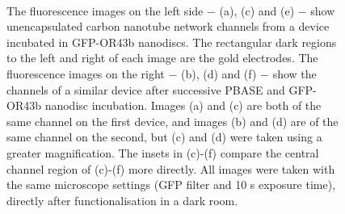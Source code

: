 \documentclass[
  a4paper,
]{scrbook}
\begin{document}
\begin{figure}
\begin{minipage}[t]{0.47\linewidth}
{{}

}

\subcaption{\label{fig-GFP-OR-ch3}}
\end{minipage}%
%
\begin{minipage}[t]{0.05\linewidth}

{\centering 

~

}

\end{minipage}%
%
\begin{minipage}[t]{0.47\linewidth}

{\centering 


}

\subcaption{\label{fig-PBASE-GFP-OR-ch2}}
\end{minipage}%

\caption{\label{fig-PBASE-GFP-ORs}The fluorescence images on the left
side \(-\) (a), (c) and (e) \(-\) show unencapsulated carbon nanotube
network channels from a device incubated in GFP-OR43b nanodiscs. The
rectangular dark regions to the left and right of each image are the
gold electrodes. The fluorescence images on the right \(-\) (b), (d) and
(f) \(-\) show the channels of a similar device after successive PBASE
and GFP-OR43b nanodisc incubation. Images (a) and (c) are both of the
same channel on the first device, and images (b) and (d) are of the same
channel on the second, but (c) and (d) were taken using a greater
magnification. The insets in (c)-(f) compare the central channel region
of (c)-(f) more directly. All images were taken with the same microscope
settings (GFP filter and 10 s exposure time), directly after
functionalisation in a dark room.}

\end{figure}
\end{document}
